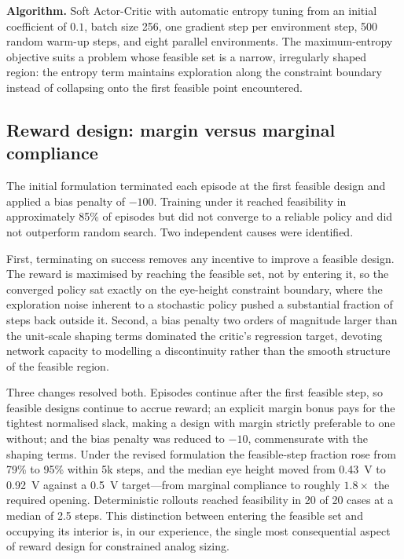 \documentclass[10pt,a4paper]{article}
\begin{document}
\textbf{Algorithm.} Soft Actor-Critic with automatic entropy tuning from an
initial coefficient of $0.1$, batch size 256, one gradient step per environment
step, 500 random warm-up steps, and eight parallel environments. The
maximum-entropy objective suits a problem whose feasible set is a narrow,
irregularly shaped region: the entropy term maintains exploration along the
constraint boundary instead of collapsing onto the first feasible point
encountered.

\subsection{Reward design: margin versus marginal compliance}
\label{sec:reward-design}

The initial formulation terminated each episode at the first feasible design and
applied a bias penalty of $-100$. Training under it reached feasibility in
approximately 85\% of episodes but did not converge to a reliable policy and did
not outperform random search. Two independent causes were identified.

First, terminating on success removes any incentive to improve a feasible design.
The reward is maximised by reaching the feasible set, not by entering it, so the
converged policy sat exactly on the eye-height constraint boundary, where the
exploration noise inherent to a stochastic policy pushed a substantial fraction
of steps back outside it. Second, a bias penalty two orders of magnitude larger
than the unit-scale shaping terms dominated the critic's regression target,
devoting network capacity to modelling a discontinuity rather than the smooth
structure of the feasible region.

Three changes resolved both. Episodes continue after the first feasible step, so
feasible designs continue to accrue reward; an explicit margin bonus pays for the
tightest normalised slack, making a design with margin strictly preferable to one
without; and the bias penalty was reduced to $-10$, commensurate with the shaping
terms. Under the revised formulation the feasible-step fraction rose from 79\% to
95\% within 5k steps, and the median eye height moved from \SI{0.43}{\volt} to
\SI{0.92}{\volt} against a \SI{0.5}{\volt} target---from marginal compliance to
roughly $1.8\times$ the required opening. Deterministic rollouts reached
feasibility in 20 of 20 cases at a median of 2.5 steps. This distinction between
entering the feasible set and occupying its interior is, in our experience, the
single most consequential aspect of reward design for constrained analog sizing.
\end{document}
